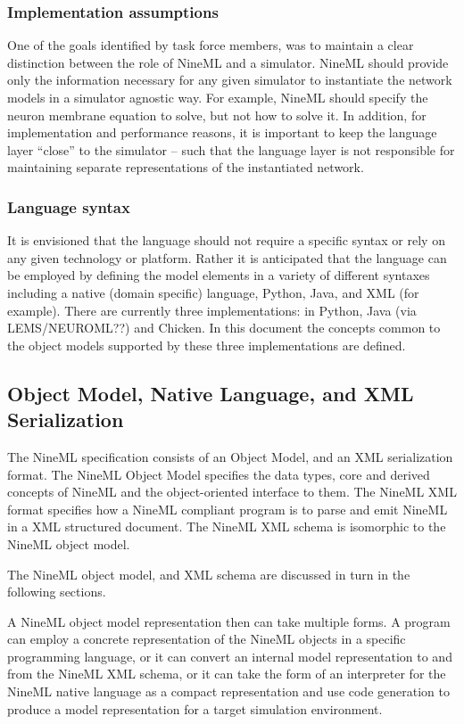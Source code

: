 \documentclass{article}
\begin{document}
\subsubsection{Implementation assumptions}

One of the goals identified by task force members, was to maintain a
clear distinction between the role of NineML and a simulator. NineML
should provide only the information necessary for any given simulator
to instantiate the network models in a simulator agnostic way.  For
example, NineML should specify the neuron membrane equation to solve,
but not how to solve it.  In addition, for implementation and
performance reasons, it is important to keep the language layer
``close'' to the simulator – such that the language layer is not
responsible for maintaining separate representations of the
instantiated network.

\subsubsection{Language syntax}

It is envisioned that the language should not require a
specific syntax or rely on any given technology or platform.
Rather it is anticipated that the language can be
employed by defining the model elements in a variety of different
syntaxes including a native (domain specific) language, Python, Java,
and XML (for example). There are currently three implementations:
in Python, Java (via LEMS/NEUROML??) and Chicken. In this document
the concepts common to the object models supported by these three
implementations are defined.

\subsection{Object Model, Native Language, and XML Serialization}

The NineML specification consists of an Object Model, and an XML serialization
format. The NineML Object Model specifies the data types, core and derived
concepts of NineML and the object-oriented interface to them. The NineML
XML format specifies how a NineML compliant program is to parse and emit
NineML in a XML structured document.  The NineML XML schema is
isomorphic to the NineML object model.

The NineML object model, and XML schema are discussed in turn in the
following sections.

A NineML object model representation then can take multiple forms.  A
program can employ a concrete representation of the NineML objects in
a specific programming language, or it can convert an internal model
representation to and from the NineML XML schema, or it can take the
form of an interpreter for the NineML native language as a compact
representation and use code generation to produce a model
representation for a target simulation environment.
\end{document}
